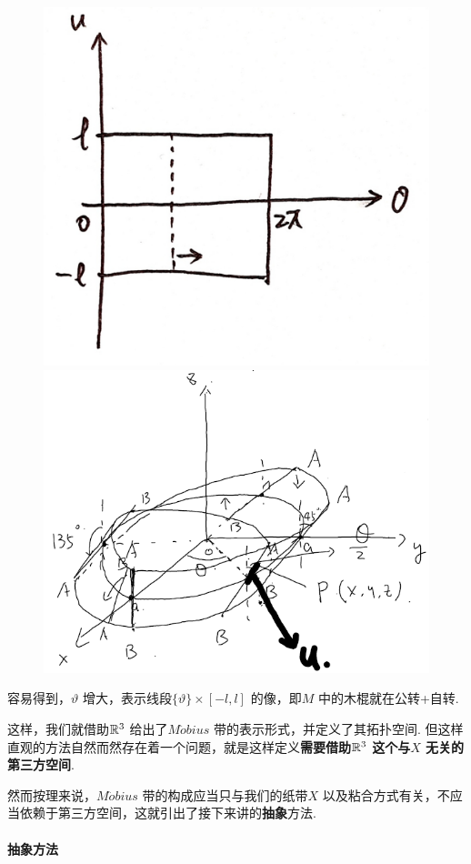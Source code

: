 	\begin{figure}[thbp!]
		\centering
		\begin{minipage}[t]{0.49\linewidth}
			\centering
			\includegraphics[width=0.5\linewidth]{figure/3.1.1-2}
			\caption{}
			\label{pic 3.1.1-2} %
		\end{minipage}
		\begin{minipage}[t]{0.49\linewidth}
			\centering
			\includegraphics[width=0.7\linewidth]{figure/3.1.1-3}
			\caption{}
			\label{pic 3.1.1-3} %
		\end{minipage}
	\end{figure}

	容易得到，$\vartheta$ 增大，表示线段$\{ \vartheta \} \times [-l , l]$ 的像，即$M$ 中的木棍就在公转+自转.
	
	\vspace{2em}
	这样，我们就借助$\mathbb{R}^3$ 给出了$M\ddot{o}bius$ 带的表示形式，并定义了其拓扑空间. 但这样直观的方法自然而然存在着一个问题，就是这样定义\textbf{需要借助$\mathbb{R}^3$ 这个与$X$ 无关的第三方空间}.
	
	\vspace{1em}
	然而按理来说，$M\ddot{o}bius$ 带的构成应当只与我们的纸带$X$ 以及粘合方式有关，不应当依赖于第三方空间，这就引出了接下来讲的\textbf{抽象}方法.
	
\newpage
\paragraph{抽象方法}








	\ifx\allfiles\undefined

\fi